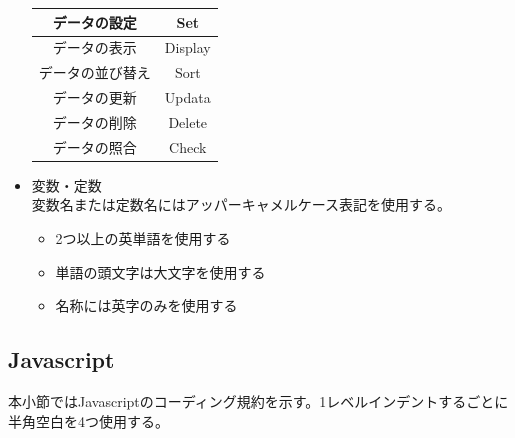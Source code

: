 \documentclass[a4j]{jarticle}
\begin{document}
\begin{itemize}
\begin{table}[H]
\begin{center}
\begin{tabular}{|c|c|}
			データの設定 & Set\\\hline
			データの表示 & Display\\\hline
			データの並び替え & Sort\\\hline
			データの更新  & Updata\\\hline
			データの削除  & Delete\\\hline
			データの照合 & Check\\\hline
			\end{tabular}
			\end{center}
			\end{table}
	\item 変数・定数\\
		変数名または定数名にはアッパーキャメルケース表記を使用する。
	\begin{itemize}
		\item 2つ以上の英単語を使用する
		\item 単語の頭文字は大文字を使用する
		\item 名称には英字のみを使用する
	\end{itemize}


\end{itemize}
\subsection{Javascript}

本小節ではJavascriptのコーディング規約を示す。1レベルインデントするごとに半角空白を4つ使用する。
\end{document}
